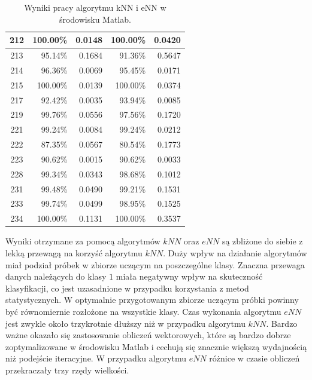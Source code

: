 \begin{table}[H]
\begin{tabular}{|c|r|r|r|r|}
\hline
212 & 100.00\% & 0.0148 & 100.00\% & 0.0420 \\ 
\hline
213 & 95.14\% & 0.1684 & 91.36\% & 0.5647 \\ 
\hline
214 & 96.36\% & 0.0069 & 95.45\% & 0.0171 \\ 
\hline
215 & 100.00\% & 0.0139 & 100.00\% & 0.0374 \\ 
\hline
217 & 92.42\% & 0.0035 & 93.94\% & 0.0085 \\ 
\hline
219 & 99.76\% & 0.0556 & 97.56\% & 0.1720 \\ 
\hline
221 & 99.24\% & 0.0084 & 99.24\% & 0.0212 \\ 
\hline
222 & 87.35\% & 0.0567 & 80.54\% & 0.1773 \\ 
\hline
223 & 90.62\% & 0.0015 & 90.62\% & 0.0033 \\ 
\hline
228 & 99.34\% & 0.0343 & 98.68\% & 0.1012 \\ 
\hline
231 & 99.48\% & 0.0490 & 99.21\% & 0.1531 \\ 
\hline
233 & 99.74\% & 0.0499 & 98.95\% & 0.1525 \\ 
\hline
234 & 100.00\% & 0.1131 & 100.00\% & 0.3537 \\ 
\hline

		
	\end{tabular}
	\caption{Wyniki pracy algorytmu kNN i eNN w środowisku Matlab.}
	\label{tab:matlab-skutecznosc}
	
\end{table}

Wyniki otrzymane za pomocą algorytmów $kNN$ oraz $eNN$ są zbliżone do siebie z lekką przewagą na korzyść algorytmu $kNN$. Duży wpływ na działanie algorytmów miał podział próbek w zbiorze uczącym na poszczególne klasy. Znaczna przewaga danych należących do klasy $1$ miała negatywny wpływ na skuteczność klasyfikacji, co jest uzasadnione w przypadku korzystania z metod statystycznych. W optymalnie przygotowanym zbiorze uczącym próbki powinny być równomiernie rozłożone na wszystkie klasy. Czas wykonania algorytmu $eNN$ jest zwykle około trzykrotnie dłuższy niż w przypadku algorytmu $kNN$. Bardzo ważne okazało się zastosowanie obliczeń wektorowych, które są bardzo dobrze zoptymalizowane w środowisku Matlab i cechują się znacznie większą wydajnością niż podejście iteracyjne. W przypadku algorytmu $eNN$ różnice w czasie obliczeń przekraczały trzy rzędy wielkości.